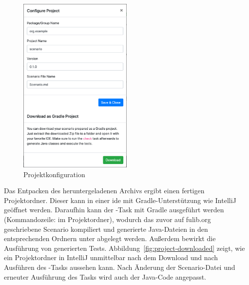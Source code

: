 \begin{figure}
    \centering
    \includegraphics[width=0.5\textwidth]{chapter/fulib.org/img/project-config.png}
    \caption{Projektkonfiguration}
    \label{fig:project-config}
\end{figure}

Das Entpacken des heruntergeladenen Archivs ergibt einen fertigen Projektordner.
Dieser kann in einer \ac{ide} mit Gradle-Unterstützung wie IntelliJ geöffnet werden.
Daraufhin kann der -Task mit Gradle ausgeführt werden (Kommandozeile:  im Projektordner), wodurch das zuvor auf fulib.org geschriebene Scenario kompiliert und generierte Java-Dateien in den entsprechenden Ordnern unter  abgelegt werden.
Außerdem bewirkt  die Ausführung von generierten Tests.
Abbildung~\ref{fig:project-downloaded} zeigt, wie ein Projektordner in IntelliJ unmittelbar nach dem Download und nach Ausführen des -Tasks aussehen kann.
Nach Änderung der Scenario-Datei und erneuter Ausführung des Tasks wird auch der Java-Code angepasst.

